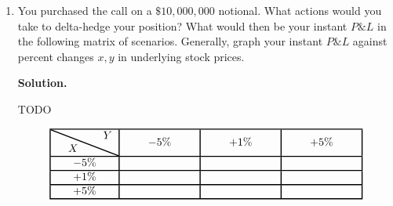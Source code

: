 \documentclass[12pt]{article}
\newenvironment{solution}{\vspace{0.2cm} \textbf{Solution.}}{}
\begin{document}
\begin{enumerate}[label=(\alph*)]
\begin{solution}
			For the same values, finite differences (although explicit greeks could be computed) give: $\delta_X = 2.156, \delta_Y = 2.156, \gamma_X = -1.428, \gamma_Y = -1.428, \gamma_{XY} = 1.428$.
			
		\end{solution}
		
		\item You purchased the call on a $\$10,000,000$ notional. What actions would you take to delta-hedge your position? What would then be your instant $P\&L$ in the following matrix of scenarios. Generally, graph your instant $P\&L$ against percent changes $x, y$ in underlying stock prices.
		
		\begin{solution}
			
			TODO
			
		\[
		\linethickness{1pt}
		\setlength{\arrayrulewidth}{1pt}
		\begin{tabular}{|c|c|c|c|}
			\hline
			\backslashbox{$\quad X$}{$\quad Y$} & $\qquad -5\% \qquad$ & \qquad $+1\%\qquad$ & \qquad $+5\%\qquad$ \\ \hline
			$-5\%$ &  &  & \\ \hline
			$+1\%$ &  &  & \\ \hline
			$+5\%$ &  &  & \\ \hline
		\end{tabular}
		\]
			
		\end{solution}
	
	\end{enumerate}
\end{document}
